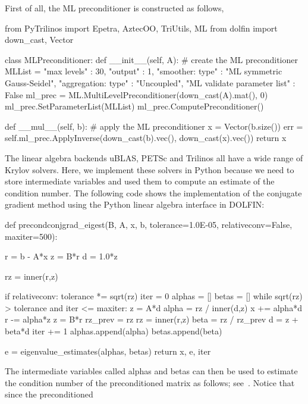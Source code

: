 First of all, the ML preconditioner is constructed as follows,
\begin{python}
from PyTrilinos import Epetra, AztecOO, TriUtils, ML
from dolfin import down_cast, Vector

class MLPreconditioner:
    def __init__(self, A):
        # create the ML preconditioner
        MLList = {
              "max levels"        : 30,
              "output"            : 1,
              "smoother: type"    : "ML symmetric Gauss-Seidel",
              "aggregation: type" : "Uncoupled",
              "ML validate parameter list" : False
        }
        ml_prec = ML.MultiLevelPreconditioner(down_cast(A).mat(), 0)
        ml_prec.SetParameterList(MLList)
        ml_prec.ComputePreconditioner()

    def __mul__(self, b):
        # apply the ML preconditioner
        x = Vector(b.size())
        err = self.ml_prec.ApplyInverse(down_cast(b).vec(),
                                        down_cast(x).vec())
        return x
\end{python}
The linear algebra backends uBLAS, PETSc and Trilinos all have a wide
range of Krylov solvers. Here, we implement these solvers in Python
because we need to store intermediate variables and used them to
compute an estimate of the condition number.  The following code shows
the implementation of the conjugate gradient method using the Python
linear algebra interface in DOLFIN:
\begin{python}
def precondconjgrad_eigest(B, A, x, b, tolerance=1.0E-05,
                           relativeconv=False, maxiter=500):

    r = b - A*x
    z = B*r
    d = 1.0*z

    rz = inner(r,z)

    if relativeconv: tolerance *= sqrt(rz)
    iter = 0
    alphas = []
    betas = []
    while sqrt(rz) > tolerance and iter <= maxiter:
        z = A*d
        alpha = rz / inner(d,z)
        x += alpha*d
        r -= alpha*z
        z = B*r
        rz_prev = rz
        rz = inner(r,z)
        beta =  rz / rz_prev
        d = z + beta*d
        iter += 1
        alphas.append(alpha)
        betas.append(beta)

    e = eigenvalue_estimates(alphas, betas)
    return x, e, iter
\end{python}
The intermediate variables called alphas and betas can then be used to
estimate the condition number of the preconditioned matrix as follows;
see~\citet{Saad2003}.  Notice that since the preconditioned
